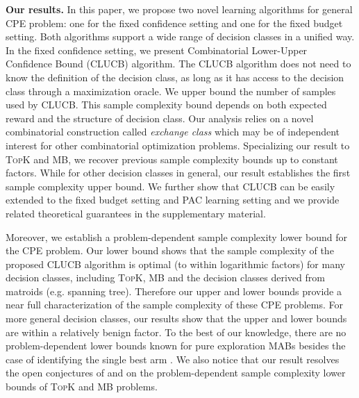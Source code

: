 \documentclass{article}
\newcommand{\Algorithm}{{\small \textsf{CLUCB}}\xspace}
\newcommand{\Problem}{{CPE}\xspace}
\newcommand{\MultiIdent}{\textsc{TopK}\xspace}
\newcommand{\MultiBandit}{\textsc{MB}\xspace}
\begin{document}
\textbf{Our results.}
In this paper, we propose two novel learning algorithms for general \Problem problem: one for the fixed confidence setting and one for the fixed budget setting.
Both algorithms support a wide range of decision classes in a unified way. 
In the fixed confidence setting, we present Combinatorial Lower-Upper Confidence Bound (\Algorithm) algorithm.
The \Algorithm algorithm does not need to know the definition of the decision class, as long as it has access to the decision class through a maximization oracle.
We upper bound the number of samples used by \Algorithm. 
This sample complexity bound depends on both expected reward and the structure of decision class. 
Our analysis relies on a novel combinatorial construction called \emph{exchange class} which may be of independent interest for other combinatorial optimization problems. 
Specializing our result  to \MultiIdent and \MultiBandit, we recover previous sample complexity bounds \citep{kalyanakrishnan2012pac,gabillon2012best} up to constant factors.
While for other decision classes in general, our result establishes the first sample complexity upper bound. 
We further show that \Algorithm can be easily extended to the fixed budget setting and PAC learning setting and we provide related theoretical guarantees in the supplementary material.  

Moreover, we establish a problem-dependent sample complexity lower bound for the \Problem problem.  
Our lower bound shows that the sample complexity of the proposed \Algorithm algorithm is optimal (to within logarithmic factors) for many  decision classes, including \MultiIdent, \MultiBandit and the decision classes derived from matroids (e.g. spanning tree). 
Therefore our upper and lower bounds  provide a near full characterization of the sample complexity of these \Problem problems. 
For more general decision classes, our results show that the upper and lower bounds are within a relatively benign factor. 
To the best of our knowledge, there are no problem-dependent lower bounds known for pure exploration MABs besides the case of identifying the single best arm \citep{mannor2004sample,audibert2010best}.
We also notice that our result resolves the open conjectures of \citet{kalyanakrishnan2012pac} and \citet{bubeck2013multiple} on the problem-dependent sample complexity lower bounds of \MultiIdent and \MultiBandit problems.
\end{document}
